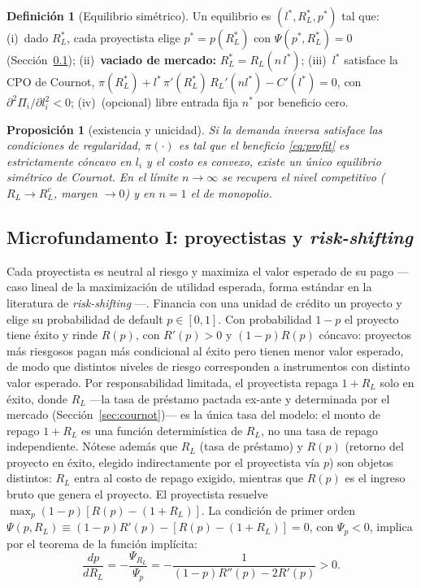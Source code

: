 \documentclass[11pt]{article}
\theoremstyle{plain}
\newtheorem{proposition}{Proposición}
\theoremstyle{definition}
\newtheorem{definition}{Definición}
\theoremstyle{remark}
\newcommand{\1}{\mathbf{1}}
\begin{document}
\begin{definition}[Equilibrio simétrico]\label{def:eq}
Un equilibrio es $(l^*,R_L^*,p^*)$ tal que: (i)~dado $R_L^*$, cada proyectista elige
$p^*=p(R_L^*)$ con $\Psi(p^*,R_L^*)=0$ (Sección~\ref{sec:proyectistas}); (ii)~\textbf{vaciado de
mercado:} $R_L^*=R_L(n\,l^*)$; (iii)~$l^*$ satisface la CPO de Cournot,
$\pi(R_L^*)+l^*\,\pi'(R_L^*)\,R_L'(n l^*)-C'(l^*)=0$, con $\partial^2\Pi_i/\partial l_i^2<0$;
(iv)~(opcional) libre entrada fija $n^*$ por beneficio cero.
\end{definition}

\begin{proposition}[existencia y unicidad]\label{prop:exist}
Si la demanda inversa satisface las condiciones de regularidad, $\pi(\cdot)$ es tal que el
beneficio \eqref{eq:profit} es estrictamente cóncavo en $l_i$ y el costo es convexo, existe un
único equilibrio simétrico de Cournot. En el límite $n\to\infty$ se recupera el nivel
competitivo ($R_L\to R_L^c$, margen $\to 0$) y en $n=1$ el de monopolio.
\end{proposition}

\subsection{Microfundamento I: proyectistas y \textit{risk-shifting}}\label{sec:proyectistas}
Cada proyectista es neutral al riesgo y maximiza el valor esperado de su pago —caso lineal de
la maximización de utilidad esperada, forma estándar en la literatura de \textit{risk-shifting}
\citep{StiglitzWeiss1981,BoydDeNicolo2005}—. Financia con una unidad de crédito un proyecto y
elige su probabilidad de default $p\in[0,1]$. Con probabilidad $1-p$ el proyecto tiene éxito y
rinde $R(p)$, con $R'(p)>0$ y $(1-p)R(p)$ cóncavo: proyectos más riesgosos pagan más
condicional al éxito pero tienen menor valor esperado, de modo que distintos niveles de riesgo
corresponden a instrumentos con distinto valor esperado. Por responsabilidad limitada, el
proyectista repaga $1+R_L$ solo en éxito, donde $R_L$ —la tasa de préstamo pactada ex-ante y
determinada por el mercado (Sección~\ref{sec:cournot})— es la única tasa del modelo: el monto de
repago $1+R_L$ es una función determinística de $R_L$, no una tasa de repago independiente.
Nótese además que $R_L$ (tasa de préstamo) y $R(p)$ (retorno del proyecto en éxito, elegido
indirectamente por el proyectista vía $p$) son objetos distintos: $R_L$ entra al costo de
repago exigido, mientras que $R(p)$ es el ingreso bruto que genera el proyecto. El proyectista
resuelve $\max_p (1-p)[R(p)-(1+R_L)]$. La condición de primer orden
$\Psi(p,R_L)\equiv(1-p)R'(p)-[R(p)-(1+R_L)]=0$, con $\Psi_p<0$, implica por el teorema de la
función implícita:
\begin{equation}
\frac{dp}{dR_L} = -\frac{\Psi_{R_L}}{\Psi_p} = -\frac{1}{(1-p)R''(p)-2R'(p)} > 0.
\label{eq:riskshift}
\end{equation}
\end{document}
